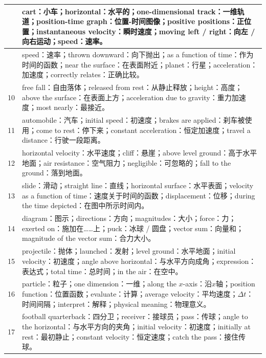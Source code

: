 \documentclass[12pt,a4paper]{article}
\begin{document}
\begin{longtable}{|>{\raggedright\arraybackslash}p{2.2cm}|>{\raggedright\arraybackslash}p{12.8cm}|}
8 &
cart：小车；horizontal：水平的；one-dimensional track：一维轨道；position-time graph：位置-时间图像；positive positions：正位置；instantaneous velocity：瞬时速度；moving left / right：向左 / 向右运动；speed：速率。 \\
\hline

9 &
speed：速率；thrown downward：向下抛出；as a function of time：作为时间的函数；near the surface：在表面附近；planet：行星；acceleration：加速度；correctly relates：正确比较。 \\
\hline

10 &
free fall：自由落体；released from rest：从静止释放；height：高度；above the surface：在表面上方；acceleration due to gravity：重力加速度；most nearly：最接近。 \\
\hline

11 &
automobile：汽车；initial speed：初速度；brakes are applied：刹车被使用；come to rest：停下来；constant acceleration：恒定加速度；travel a distance：行驶一段距离。 \\
\hline

12 &
horizontal velocity：水平速度；cliff：悬崖；above level ground：高于水平地面；air resistance：空气阻力；negligible：可忽略的；fall to the ground：落到地面。 \\
\hline

13 &
slide：滑动；straight line：直线；horizontal surface：水平表面；velocity as a function of time：速度关于时间的函数；displacement：位移；during the time depicted：在图中所示时间内。 \\
\hline

14 &
diagram：图示；directions：方向；magnitudes：大小；force：力；exerted on：施加在……上；puck：冰球 / 圆盘；vector sum：向量和；magnitude of the vector sum：合力大小。 \\
\hline

15 &
projectile：抛体；launched：发射；level ground：水平地面；initial velocity：初速度；angle above horizontal：与水平方向成角；expression：表达式；total time：总时间；in the air：在空中。 \\
\hline

16 &
particle：粒子；one dimension：一维；along the $x$-axis：沿$x$轴；position function：位置函数；evaluate：计算；average velocity：平均速度；$\Delta t$：时间间隔；interpret：解释；physical meaning：物理意义。 \\
\hline

17 &
football quarterback：四分卫；receiver：接球员；pass：传球；angle to the horizontal：与水平方向的夹角；initial velocity：初速度；initially at rest：最初静止；constant velocity：恒定速度；catch the pass：接住传球。 \\
\hline


\end{longtable}
\end{document}
